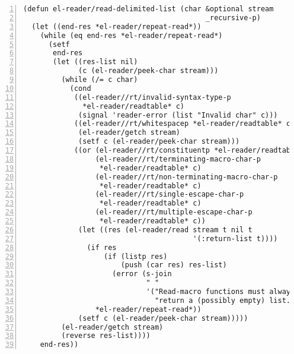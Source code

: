 \documentclass[a4paper,10pt,twoside]{report}
\newcommand{\fun}[1]{\texttt{#1}}
\begin{document}
\begin{lstlisting}[style=lispcode,label={code:read-delim-list},caption={Code for
  \fun{read-delimited-list}},numbers=left]
(defun el-reader/read-delimited-list (char &optional stream
                                           _recursive-p)
  (let ((end-res *el-reader/repeat-read*))
    (while (eq end-res *el-reader/repeat-read*)
      (setf
       end-res
       (let ((res-list nil)
             (c (el-reader/peek-char stream)))
         (while (/= c char)
           (cond
            ((el-reader//rt/invalid-syntax-type-p
              *el-reader/readtable* c)
             (signal 'reader-error (list "Invalid char" c)))
            ((el-reader//rt/whitespacep *el-reader/readtable* c)
             (el-reader/getch stream)
             (setf c (el-reader/peek-char stream)))
            ((or (el-reader//rt/constituentp *el-reader/readtable* c)
                 (el-reader//rt/terminating-macro-char-p
                  *el-reader/readtable* c)
                 (el-reader//rt/non-terminating-macro-char-p
                  *el-reader/readtable* c)
                 (el-reader//rt/single-escape-char-p
                  *el-reader/readtable* c)
                 (el-reader//rt/multiple-escape-char-p
                  *el-reader/readtable* c))
             (let ((res (el-reader/read stream t nil t
                                        '(:return-list t))))
               (if res
                   (if (listp res)
                       (push (car res) res-list)
                     (error (s-join
                             " "
                             '("Read-macro functions must always "
                               "return a (possibly empty) list."))))
                 *el-reader/repeat-read*))
             (setf c (el-reader/peek-char stream)))))
         (el-reader/getch stream)
         (reverse res-list))))
    end-res))
\end{lstlisting}


\end{document}

